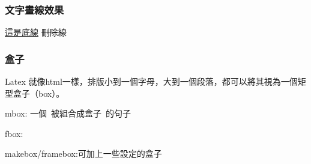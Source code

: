 \subsubsection{文字畫線效果}

\hbox{\uline{這是底線}}
\hbox{}
\hbox{}
\hbox{\sout{刪除線}}
\hbox{}

\subsubsection{盒子}
Latex 就像html一樣，排版小到一個字母，大到一個段落，都可以將其視為一個矩型盒子（box）。

mbox:
\mbox{一個 被組合成盒子 的句子}

fbox:

makebox/framebox:可加上一些設定的盒子

\hbox{}



\newpage
